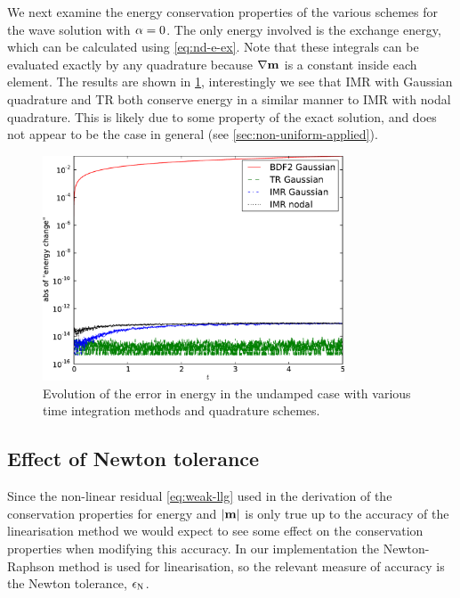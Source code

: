 We next examine the energy conservation properties of the various schemes for the wave solution with $\alpha = 0$.
The only energy involved is the exchange energy, which can be calculated using \cref{eq:nd-e-ex}.
Note that these integrals can be evaluated exactly by any quadrature because $\nabla \boldsymbol{\mathrm{m}}$ is a constant inside each element.
The results are shown in \cref{fig:energy-error-2d}, interestingly we see that IMR with Gaussian quadrature and TR both conserve energy in a similar manner to IMR with nodal quadrature.
This is likely due to some property of the exact solution, and does not appear to be the case in general (see \cref{sec:non-uniform-applied}).
\begin{figure}
  \centering
  \includegraphics[width=0.8\textwidth]{plots/2d_wave_solution_energy/absofenergychangevstimes}
  \caption{Evolution of the error in energy in the undamped case with various time integration methods and quadrature schemes.}
  \label{fig:energy-error-2d}
\end{figure}


\subsection{Effect of Newton tolerance}
\label{sec:effect-newt-toler-m-conservation}

Since the non-linear residual \cref{eq:weak-llg} used in the derivation of the conservation properties for energy and $\left|{\boldsymbol{\mathrm{m}}} \right|$ is only true up to the accuracy of the linearisation method we would expect to see some effect on the conservation properties when modifying this accuracy.
In our implementation the Newton-Raphson method is used for linearisation, so the relevant measure of accuracy is the Newton tolerance, $\epsilon_{\mathrm{N}}$.


